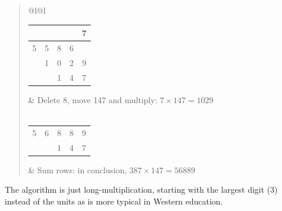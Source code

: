 \begin{quote}
\begin{tabular}{@{}l@{\qquad}l}
\begin{tabular}{|c|c|c|c|c|}
		  \hline
		  &&&&7\\\hline
		  5&5&8&6&\\\hline
		  &1&0&2&9\\\hline
		  &&1&4&7\\\hline
	  \end{tabular}
		&
		Delete 8, move 147 and multiply: $7\times 147=1029$
		\\
		\\[-6pt]
	  \begin{tabular}{|c|c|c|c|c|}
		  \hline
		  &&&&\\\hline
		  5&6&8&8&9\\\hline
		  &&1&4&7\\\hline
	  \end{tabular}
		&
		Sum rows: in conclusion, $387\times 147=56889$
  \end{tabular}
\end{quote}
The algorithm is just long-multiplication, starting with the largest digit (3) instead of the units as is more typical in Western education.\smallbreak
  
